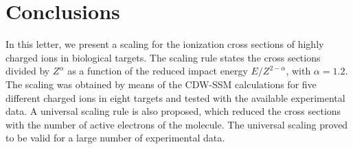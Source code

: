 \documentclass[10pt,showpacs,showkeys,twocolumn]{revtex4-1} %
\providecommand{\DIFdelbegin}{} %
\providecommand{\DIFdelend}{} %
\newcommand{\DIFscaledelfig}{0.5}
\newlength{\DIFdelgraphicswidth} %
\newlength{\DIFdelgraphicsheight} %
\newcommand{\DIFdelincludegraphics}[2][]{%
\sbox{\DIFdelgraphicsbox}{\DIFOincludegraphics[#1]{#2}}%
\settoboxwidth{\DIFdelgraphicswidth}{\DIFdelgraphicsbox} %
\settoboxtotalheight{\DIFdelgraphicsheight}{\DIFdelgraphicsbox} %
\scalebox{\DIFscaledelfig}{%
\parbox[b]{\DIFdelgraphicswidth}{\usebox{\DIFdelgraphicsbox}\\[-\baselineskip] \rule{\DIFdelgraphicswidth}{0em}}\llap{\resizebox{\DIFdelgraphicswidth}{\DIFdelgraphicsheight}{%
\setlength{\unitlength}{\DIFdelgraphicswidth}%
\begin{picture}(1,1)%
\thicklines\linethickness{2pt} %
{\color[rgb]{1,0,0}\put(0,0){\framebox(1,1){}}}%
{\color[rgb]{1,0,0}\put(0,0){\line( 1,1){1}}}%
{\color[rgb]{1,0,0}\put(0,1){\line(1,-1){1}}}%
\end{picture}%
}\hspace*{3pt}}} %
} %
\DeclareRobustCommand{\DIFdelbegin}{\DIFOdelbegin \let\includegraphics\DIFdelincludegraphics} %
\DeclareRobustCommand{\DIFdelend}{\DIFOaddend \let\includegraphics\DIFOincludegraphics} %
\begin{document}
\section{Conclusions}
In this letter, we present a scaling for the ionization cross sections 
of highly charged ions in biological targets. The scaling rule states 
the cross sections divided by $Z^{\alpha}$ as a function of the reduced 
impact energy $E/Z^{2-\alpha}$, with $\alpha=1.2$. The scaling was 
obtained by means of the CDW-SSM calculations for five different charged 
ions in eight targets and tested with the available experimental data. 
A universal scaling rule  is also proposed, which reduced the cross 
sections with the number of active electrons of the molecule. The 
universal scaling proved to be valid for a large number of experimental 
data.

\DIFdelbegin %
\DIFdelend %
\end{document}
